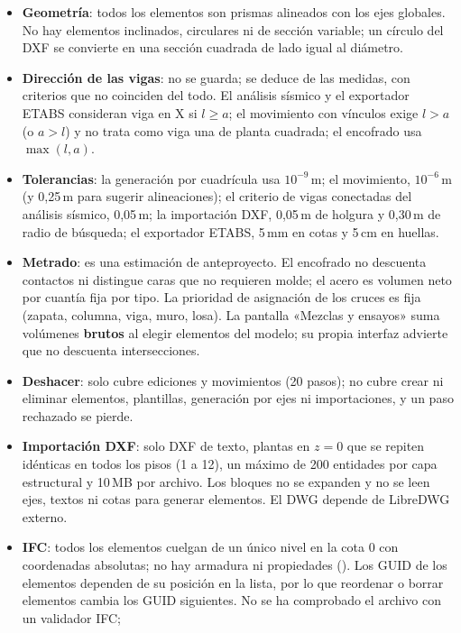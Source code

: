 \begin{itemize}
	\item \textbf{Geometría}: todos los elementos son prismas alineados con los ejes globales. No hay elementos inclinados,
	      circulares ni de sección variable; un círculo del DXF se convierte en una sección cuadrada de lado igual al
	      diámetro.
	\item \textbf{Dirección de las vigas}: no se guarda; se deduce de las medidas, con criterios que no coinciden del
	      todo. El análisis sísmico y el exportador ETABS consideran viga en X si $l \ge a$; el movimiento con vínculos
	      exige $l > a$ (o $a > l$) y no trata como viga una de planta cuadrada; el encofrado usa $\max(l, a)$.
	\item \textbf{Tolerancias}: la generación por cuadrícula usa $10^{-9}$\,m; el movimiento, $10^{-6}$\,m (y 0,25\,m
	      para sugerir alineaciones); el criterio de vigas conectadas del análisis sísmico, 0,05\,m; la importación DXF,
	      0,05\,m de holgura y 0,30\,m de radio de búsqueda; el exportador ETABS, 5\,mm en cotas y 5\,cm en huellas.
	\item \textbf{Metrado}: es una estimación de anteproyecto. El encofrado no descuenta contactos ni distingue caras
	      que no requieren molde; el acero es volumen neto por cuantía fija por tipo. La prioridad de asignación de los
	      cruces es fija (zapata, columna, viga, muro, losa). La pantalla «Mezclas y ensayos» suma volúmenes
	      \textbf{brutos} al elegir elementos del modelo; su propia interfaz advierte que no descuenta intersecciones.
	\item \textbf{Deshacer}: solo cubre ediciones y movimientos (20 pasos); no cubre crear ni eliminar elementos,
	      plantillas, generación por ejes ni importaciones, y un paso rechazado se pierde.
	\item \textbf{Importación DXF}: solo DXF de texto, plantas en $z = 0$ que se repiten idénticas en todos los pisos (1
	      a 12), un máximo de 200 entidades por capa estructural y 10\,MB por archivo. Los bloques no se expanden y no
	      se leen ejes, textos ni cotas para generar elementos. El DWG depende de LibreDWG externo.
	\item \textbf{IFC}: todos los elementos cuelgan de un único nivel en la cota 0 con coordenadas absolutas; no hay
	      armadura ni propiedades (). Los GUID de los elementos dependen de su posición en la lista, por lo que
	      reordenar o borrar elementos cambia los GUID siguientes. No se ha comprobado el archivo con un validador IFC;

\end{itemize}
